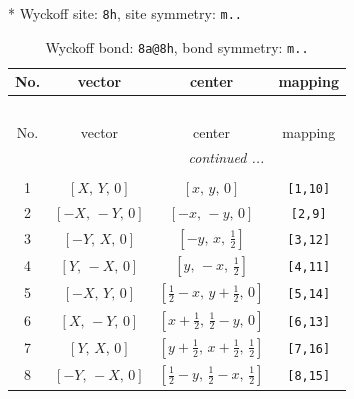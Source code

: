 \documentclass[fleqn,8pt]{jsarticle}
\begin{document}
* Wyckoff site: {\tt 8h}, site symmetry: {\tt m..}
\renewcommand{\arraystretch}{1.2}
\begin{longtable}{cccc}
\caption{Wyckoff bond: {\tt 8a@8h}, bond symmetry: {\tt m..}}
 \\
 \hline \hline
No. & vector & center & mapping \\ \hline \endfirsthead

\multicolumn{3}{l}{\tablename\ \thetable{}} \\
 \hline \hline
No. & vector & center & mapping \\ \hline \endhead

 \hline \hline
\multicolumn{3}{r}{\footnotesize\it continued ...} \\ \endfoot

 \hline \hline
\multicolumn{3}{r}{} \\ \endlastfoot

1 & $\left[ X,\, Y,\, 0 \right]$ & $\left[ x,\, y,\, 0 \right]$ & {\tt [1,10]} \\ \hline
2 & $\left[ - X,\, - Y,\, 0 \right]$ & $\left[ - x,\, - y,\, 0 \right]$ & {\tt [2,9]} \\ \hline
3 & $\left[ - Y,\, X,\, 0 \right]$ & $\left[ - y,\, x,\, \frac{1}{2} \right]$ & {\tt [3,12]} \\ \hline
4 & $\left[ Y,\, - X,\, 0 \right]$ & $\left[ y,\, - x,\, \frac{1}{2} \right]$ & {\tt [4,11]} \\ \hline
5 & $\left[ - X,\, Y,\, 0 \right]$ & $\left[ \frac{1}{2} - x,\, y + \frac{1}{2},\, 0 \right]$ & {\tt [5,14]} \\ \hline
6 & $\left[ X,\, - Y,\, 0 \right]$ & $\left[ x + \frac{1}{2},\, \frac{1}{2} - y,\, 0 \right]$ & {\tt [6,13]} \\ \hline
7 & $\left[ Y,\, X,\, 0 \right]$ & $\left[ y + \frac{1}{2},\, x + \frac{1}{2},\, \frac{1}{2} \right]$ & {\tt [7,16]} \\ \hline
8 & $\left[ - Y,\, - X,\, 0 \right]$ & $\left[ \frac{1}{2} - y,\, \frac{1}{2} - x,\, \frac{1}{2} \right]$ & {\tt [8,15]} \\
\end{longtable}
\renewcommand{\arraystretch}{1.2}
\end{document}
